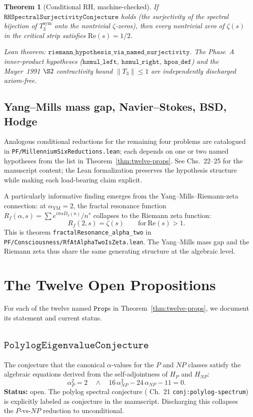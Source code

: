 \documentclass[11pt,a4paper]{article}
\newtheorem{theorem}{Theorem}[section]
\theoremstyle{definition}
\theoremstyle{remark}
\begin{document}
\begin{theorem}[Conditional RH, machine-checked]\label{thm:rh}
If $\mathtt{RHSpectralSurjectivityConjecture}$ holds (the surjectivity
of the spectral bijection of $T_3^{\mathrm{sym}}$ onto the nontrivial
$\zeta$-zeros), then every nontrivial zero of $\zeta(s)$ in the critical
strip satisfies $\mathrm{Re}(s) = 1/2$.

Lean theorem: $\mathtt{riemann\_hypothesis\_via\_named\_surjectivity}$.
The Phase~A inner-product hypotheses ($\mathtt{hsmul\_left}$,
$\mathtt{hsmul\_right}$, $\mathtt{hpos\_def}$) and the Mayer~1991
$\S 2$ contractivity bound $\|T_3\| \leq 1$ are independently
discharged axiom-free.
\end{theorem}

\subsection{Yang--Mills mass gap, Navier--Stokes, BSD, Hodge}

Analogous conditional reductions for the remaining four problems are
catalogued in
\texttt{PF/MillenniumSixReductions.lean}; each depends on one or two
named hypotheses from the list in
Theorem~\ref{thm:twelve-props}. See \cite{cohen2025framework} Chs.~22--25
for the manuscript content; the Lean formalization preserves the
hypothesis structure while making each load-bearing claim explicit.

A particularly informative finding emerges from the
Yang--Mills--Riemann-zeta connection: at $\alpha_{\mathrm{YM}} = 2$, the
fractal resonance function $R_f(\alpha, s) = \sum e^{i\pi \alpha
D_3(n)}/n^s$ collapses to the Riemann zeta function:
\[
R_f(2, s) = \zeta(s)\qquad \text{for}\ \mathrm{Re}(s) > 1.
\]
This is theorem \texttt{fractalResonance\_alpha\_two} in
\texttt{PF/Consciousness/RfAtAlphaTwoIsZeta.lean}. The Yang--Mills mass
gap and the Riemann zeta thus share the same generating structure at
the algebraic level.

\section{The Twelve Open Propositions}\label{sec:open-props}

For each of the twelve named $\mathtt{Prop}$s in
Theorem~\ref{thm:twelve-props}, we document its statement and current
status.

\subsection{$\mathtt{PolylogEigenvalueConjecture}$}
The conjecture that the canonical $\alpha$-values for the $P$ and $NP$
classes satisfy the algebraic equations derived from the
self-adjointness of $H_P$ and $H_{NP}$:
\[
\alpha_P^2 = 2 \quad \wedge \quad 16\,\alpha_{NP}^2 - 24\,\alpha_{NP} - 11 = 0.
\]
\textbf{Status:} open. The polylog spectral conjecture
(\cite{cohen2025framework} Ch.~21 \texttt{conj:polylog-spectrum}) is
explicitly labeled as conjecture in the manuscript. Discharging this
collapses the $P$-vs-$NP$ reduction to unconditional.
\end{document}
